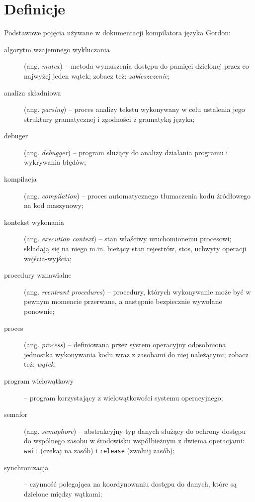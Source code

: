 \documentclass{documentation}
\begin{document}
\section{Definicje}
\noindent Podstawowe pojęcia używane w dokumentacji kompilatora języka Gordon:
\\
\begin{description}
    \item[algorytm wzajemnego wykluczania] (ang. \emph{mutex}) -- metoda wymuszenia dostępu do pamięci dzielonej przez co najwyżej jeden wątek; zobacz też: \emph{zakleszczenie};\\
    \item[analiza składniowa] (ang. \emph{parsing}) -- proces analizy tekstu wykonywany w celu ustalenia jego struktury gramatycznej i zgodności z gramatyką języka;\\
    \item[debuger] (ang. \emph{debugger}) -- program służący do analizy działania programu i wykrywania błędów;\\
    \item[kompilacja] (ang. \emph{compilation}) -- proces automatycznego tłumaczenia kodu źródłowego na kod maszynowy;\\
    \item[kontekst wykonania] (ang. \emph{execution context}) -- stan właściwy uruchomionemu procesowi; składają się na niego m.in. bieżący stan rejestrów, stos, uchwyty operacji wejścia-wyjścia;\\
    \item[procedury wznawialne] (ang. \emph{reentrant procedures}) -- procedury, których wykonywanie może być w pewnym momencie przerwane, a następnie bezpiecznie wywołane ponownie;\\
    \item[proces] (ang. \emph{process}) -- definiowana przez system operacyjny odosobniona jednostka wykonywania kodu wraz z zasobami do niej należącymi; zobacz też: \emph{wątek};\\
    \item[program wielowątkowy] -- program korzystający z wielowątkowości systemu operacyjnego;\\
    \item[semafor] (ang. \emph{semaphore}) -- abstrakcyjny typ danych służący do ochrony dostępu do wspólnego zasobu w środowisku współbieżnym z dwiema operacjami: \texttt{wait} (czekaj na zasób) i \texttt{release} (zwolnij zasób);\\
    \item[synchronizacja] -- czynność polegająca na koordynowaniu dostępu do danych, które są dzielone między wątkami;\\

\end{description}
\end{document}
